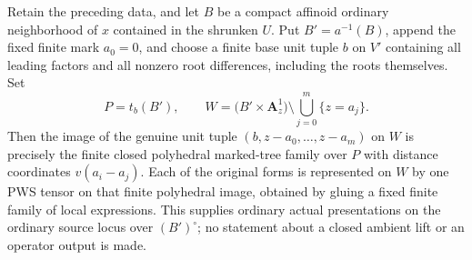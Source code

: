 \begin{proposition}
\label{r15b:local-whole-source-presentation}
Retain the preceding data, and let $B$ be a compact affinoid
ordinary neighborhood of $x$ contained in the shrunken $U$.
Put $B'=a^{-1}(B)$, append the fixed finite mark $a_0=0$, and
choose a finite base unit tuple $b$ on $V'$ containing all
leading factors and all nonzero root differences, including the roots
themselves. Set
\[
 P=t_b(B'),\qquad
 W=\bigl(B'\times\mathbf A^1_z\bigr)
                   \setminus\bigcup_{j=0}^m\{z=a_j\}.
\tag{SP15.7}\label{r15b:local-W}
\]
Then the image of the genuine unit tuple
$(b,z-a_0,\ldots,z-a_m)$ on $W$ is precisely the finite
closed polyhedral marked-tree family over $P$ with distance
coordinates $v(a_i-a_j)$. Each of the original forms is
represented on $W$ by one PWS tensor on that finite polyhedral
image, obtained by gluing a fixed finite family of local
expressions. This supplies ordinary actual presentations on the
ordinary source locus over $(B')^\circ$; no statement about a
closed ambient lift or an operator output is made.
\end{proposition}

